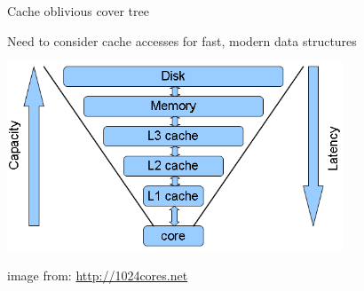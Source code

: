\begin{frame}[fragile]{Cache oblivious cover tree}

%
Need to consider cache accesses for fast, modern data structures

%
\begin{center}
\includegraphics[width=10cm]{slides/covertree/cpu_cache_structure}
\end{center}

{\tiny image from: \url{http://1024cores.net} }
\end{frame}


